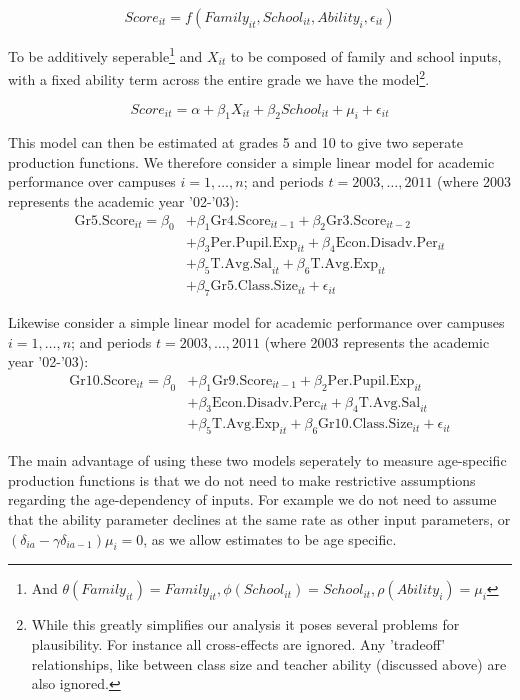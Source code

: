 \documentclass[11pt]{article}
\begin{document}
$$Score_{it} = f(Family_{it},School_{it},Ability_{i},\epsilon_{it})$$

To be additively seperable\footnote{And $\theta(Family_{it})=Family_{it}, \phi(School_{it})=School_{it}, \rho(Ability_{i})=\mu_{i}$ } and $X_{it}$ to be composed of family and school inputs, with a fixed ability term across the entire grade we have the model\footnote{While this greatly simplifies our analysis it poses several problems for plausibility. For instance all cross-effects are ignored. Any 'tradeoff' relationships, like between class size and teacher ability (discussed above) are also ignored.}.

$$Score_{it} = \alpha+ \beta_{1}X_{it}+\beta_{2}School_{it}+\mu_{i}+\epsilon_{it}$$

This model can then be estimated at grades 5 and 10 to give two seperate production functions. We therefore consider a simple linear model for academic performance over campuses $i=1,\ldots,n$; and periods $t=2003,\ldots,2011$ (where 2003 represents the academic year '02-'03):
\begin{align*}
\mathrm{Gr5.Score}_{it} = \beta_{0} 
    &+ \beta_{1}  \mathrm{Gr4.Score}_{it-1} 
    + \beta_{2}  \mathrm{Gr3.Score}_{it-2}    \\
    &+ \beta_{3}  \mathrm{Per.Pupil.Exp}_{it} 
    + \beta_{4}  \mathrm{Econ.Disadv.Per}_{it} \\
    &+ \beta_{5}  \mathrm{T.Avg.Sal}_{it}   
    + \beta_{6}  \mathrm{T.Avg.Exp}_{it}  \\
    &+ \beta_{7}  \mathrm{Gr5.Class.Size}_{it} + \epsilon_{it}
\end{align*}

Likewise consider a simple linear model for academic performance over campuses $i=1,\ldots,n$; and periods $t=2003,\ldots,2011$ (where 2003 represents the academic year '02-'03):
\begin{align*}
\mathrm{Gr10.Score}_{it} = \beta_{0} 
    &+ \beta_{1}  \mathrm{Gr9.Score}_{it-1} 
    + \beta_{2}  \mathrm{Per.Pupil.Exp}_{it} \\
    &+ \beta_{3}  \mathrm{Econ.Disadv.Perc}_{it} 
    + \beta_{4}  \mathrm{T.Avg.Sal}_{it}  \\
    &+ \beta_{5}  \mathrm{T.Avg.Exp}_{it}  
    + \beta_{6}  \mathrm{Gr10.Class.Size}_{it} + \epsilon_{it}
\end{align*}

The main advantage of using these two models seperately to measure age-specific production functions is that we do not need to make restrictive assumptions regarding the age-dependency of inputs. For example we do not need to assume that the ability parameter declines at the same rate as other input parameters, or $(\delta_{ia}-\gamma\delta_{ia-1})\mu_{i}=0$, as we allow estimates to be age specific. 
\end{document}
